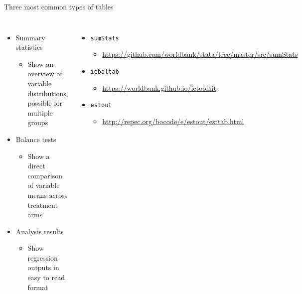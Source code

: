 \documentclass[aspectratio=169]{beamer}
\begin{document}
\begin{frame}[fragile]{Three most common types of tables}
	\begin{columns}[t]
		\begin{itemize}
			\item Summary statistics
			\begin{itemize}
				\item Show an overview of variable distributions, possible for multiple groups
			\end{itemize}
			\item Balance tests
			\begin{itemize}
				\item Show a direct comparison of variable means across treatment arms
			\end{itemize}
			\item Analysis results
				\begin{itemize}
					\item Show regression outputs in easy to read format
				\end{itemize}
		\end{itemize}

		\begin{itemize}
			\item \texttt{sumStats}
			\begin{itemize}
				\item \url{https://github.com/worldbank/stata/tree/master/src/sumStats}
			\end{itemize}
			\item \texttt{iebaltab}
			\begin{itemize}
				\item \url{https://worldbank.github.io/ietoolkit} \newline
			\end{itemize}
			\item \texttt{estout}
			\begin{itemize}
				\item \url{http://repec.org/bocode/e/estout/esttab.html}
			\end{itemize}
		\end{itemize}
	\end{columns}
\end{frame}
\end{document}
